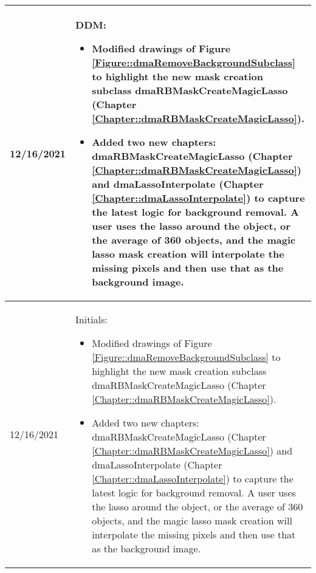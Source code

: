 \begin{longtable}{|l||p{13.5cm}|}
12/16/2021 & DDM:
\begin{itemize}[topsep=0pt,itemsep=0pt,parsep=0pt,partopsep=0pt,leftmargin=12pt]
\item Modified drawings of Figure \ref{Figure::dmaRemoveBackgroundSubclass} to
highlight the new mask creation subclass dmaRBMaskCreateMagicLasso (Chapter 
\ref{Chapter::dmaRBMaskCreateMagicLasso}).
\item Added two new chapters: dmaRBMaskCreateMagicLasso
(Chapter \ref{Chapter::dmaRBMaskCreateMagicLasso}) and dmaLassoInterpolate
(Chapter \ref{Chapter::dmaLassoInterpolate}) to capture the latest logic for 
background removal.  A user uses the lasso around the object, or the average 
of 360 objects, and the magic lasso mask creation will interpolate the missing
pixels and then use that as the background image. 
\end{itemize} 
\\ \hline

12/16/2021 & Initials:
\begin{itemize}[topsep=0pt,itemsep=0pt,parsep=0pt,partopsep=0pt,leftmargin=12pt]
\item Modified drawings of Figure \ref{Figure::dmaRemoveBackgroundSubclass} to
highlight the new mask creation subclass dmaRBMaskCreateMagicLasso (Chapter 
\ref{Chapter::dmaRBMaskCreateMagicLasso}).
\item Added two new chapters: dmaRBMaskCreateMagicLasso
(Chapter \ref{Chapter::dmaRBMaskCreateMagicLasso}) and dmaLassoInterpolate
(Chapter \ref{Chapter::dmaLassoInterpolate}) to capture the latest logic for 
background removal.  A user uses the lasso around the object, or the average 
of 360 objects, and the magic lasso mask creation will interpolate the missing
pixels and then use that as the background image. 
\end{itemize} 
\\ \hline


\end{longtable}


